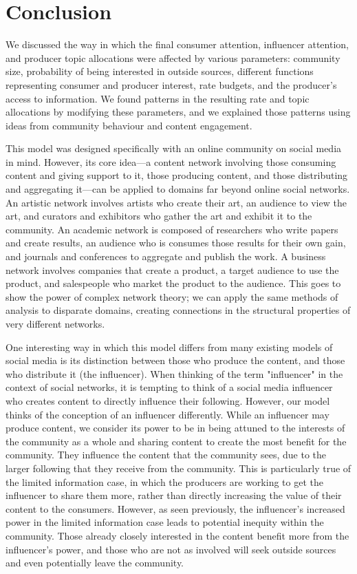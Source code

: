 \documentclass[11pt, letterpaper]{article}
\begin{document}
\section{Conclusion}

We discussed the way in which the final consumer attention, influencer attention, and producer topic allocations were affected by various parameters: community size, probability of being interested in outside sources, different functions representing consumer and producer interest, rate budgets, and the producer's access to information. We found patterns in the resulting rate and topic allocations by modifying these parameters, and we explained those patterns using ideas from community behaviour and content engagement.

This model was designed specifically with an online community on social media in mind. However, its core idea---a content network involving those consuming content and giving support to it, those producing content, and those distributing and aggregating it---can be applied to domains far beyond online social networks. An artistic network involves artists who create their art, an audience to view the art, and curators and exhibitors who gather the art and exhibit it to the community. An academic network is composed of researchers who write papers and create results, an audience who is consumes those results for their own gain, and journals and conferences to aggregate and publish the work. A business network involves companies that create a product, a target audience to use the product, and salespeople who market the product to the audience. This goes to show the power of complex network theory; we can apply the same methods of analysis to disparate domains, creating connections in the structural properties of very different networks. 

One interesting way in which this model differs from many existing models of social media is its distinction between those who produce the content, and those who distribute it (the influencer). When thinking of the term "influencer" in the context of social networks, it is tempting to think of a social media influencer who creates content to directly influence their following. However, our model thinks of the conception of an influencer differently. While an influencer may produce content, we consider its power to be in being attuned to the interests of the community as a whole and sharing content to create the most benefit for the community. They influence the content that the community sees, due to the larger following that they receive from the community. This is particularly true of the limited information case, in which the producers are working to get the influencer to share them more, rather than directly increasing the value of their content to the consumers. However, as seen previously, the influencer's increased power in the limited information case leads to potential inequity within the community. Those already closely interested in the content benefit more from the influencer's power, and those who are not as involved will seek outside sources and even potentially leave the community. 
\end{document}
